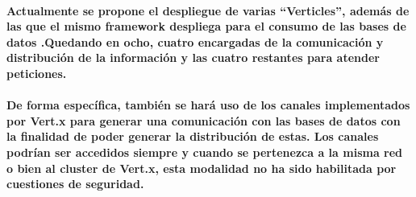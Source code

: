       \paragraph{Actualmente se propone el despliegue de varias ``Verticles'', además de las que el mismo framework despliega para el consumo de las bases de datos \cite{33}.Quedando en ocho, cuatro encargadas de la comunicación y distribución de la información y las cuatro restantes para atender peticiones.} 
      \paragraph{De forma específica, también se hará uso de los canales implementados por Vert.x para generar una comunicación con las bases de datos con la finalidad de poder generar la distribución de estas. Los canales podrían ser accedidos siempre y cuando se pertenezca a la misma red o bien al cluster de Vert.x, esta modalidad no ha sido habilitada por cuestiones de seguridad.}
